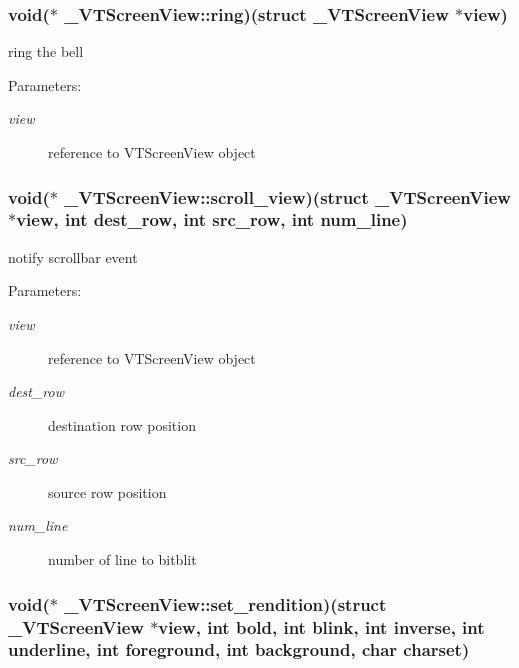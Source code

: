\subsubsection{\setlength{\rightskip}{0pt plus 5cm}void($\ast$ \_\-VTScreen\-View::ring)(struct \_\-VTScreen\-View $\ast$view)}\label{struct__VTScreenView_m6}


ring the bell

\begin{Desc}
\item[Parameters:]
\begin{description}
\item[{\em view}]reference to VTScreen\-View object \end{description}
\end{Desc}
\subsubsection{\setlength{\rightskip}{0pt plus 5cm}void($\ast$ \_\-VTScreen\-View::scroll\_\-view)(struct \_\-VTScreen\-View $\ast$view, int dest\_\-row, int src\_\-row, int num\_\-line)}\label{struct__VTScreenView_m10}


notify scrollbar event

\begin{Desc}
\item[Parameters:]
\begin{description}
\item[{\em view}]reference to VTScreen\-View object \item[{\em dest\_\-row}]destination row position \item[{\em src\_\-row}]source row position \item[{\em num\_\-line}]number of line to bitblit \end{description}
\end{Desc}
\subsubsection{\setlength{\rightskip}{0pt plus 5cm}void($\ast$ \_\-VTScreen\-View::set\_\-rendition)(struct \_\-VTScreen\-View $\ast$view, int bold, int blink, int inverse, int underline, int foreground, int background, char charset)}\label{struct__VTScreenView_m3}


